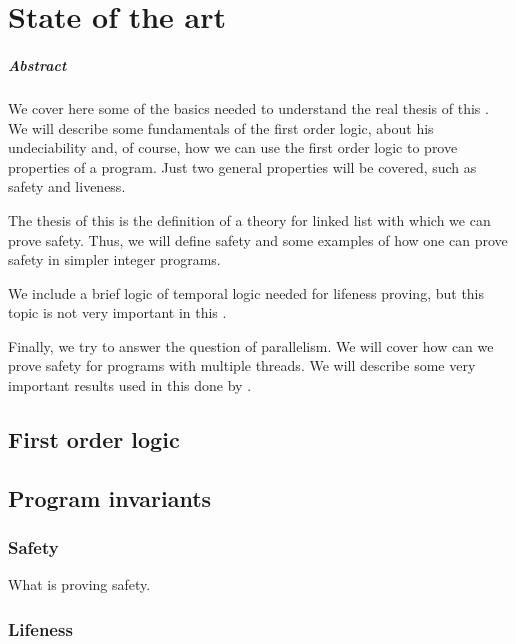 \chapter{State of the art\label{sec:estado_del_arte}}

\paragraph{Abstract}

We cover here some of the basics needed to understand the real thesis of this \thisworkm. We will describe some fundamentals of the first order logic, about his undeciability and, of course, how we can use the first order logic to prove properties of a program. Just two general properties will be covered, such as safety and liveness.

The thesis of this \thisworkm is the definition of a theory for linked list with which we can prove safety. Thus, we will define safety and some examples of how one can prove safety in simpler integer programs.

We include a brief logic of temporal logic needed for lifeness proving, but this topic is not very important in this \thisworkm.

Finally, we try to answer the question of parallelism. We will cover how can we prove safety for programs with multiple threads. We will describe some very important results used in this \thisworkm done by \citep{thesisAle}.

\section{First order logic}



\section{Program invariants}



\subsection{Safety}

What is proving safety.

\subsection{Lifeness}

